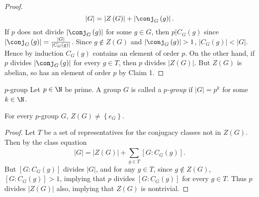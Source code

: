 \documentclass[pmath347]{subfiles}
\begin{document}
\begin{proof}
        \begin{equation*}
            \left| G \right| = \left| Z\left( G \right)  \right| + \left| \conj_G\left( g \right)  \right| .
        \end{equation*}
        If $p$ does not divide $\left| \conj_G\left( g \right) \right|$ for some $g\in G$, then $p|C_G\left( g \right)$ since $\left| \conj_G\left( g \right)  \right| = \frac{\left| G \right| }{\left| C_G\left( g \right)  \right| }$. Since $g\notin Z\left( G \right)$ and $\left| \conj_G\left( g \right)  \right| > 1$, $\left| C_G\left( g \right)  \right| < \left| G \right|$. Hence by induction $C_G\left( g \right)$ contains an element of order $p$. On the other hand, if $p$ divides $\left| \conj_G\left( g \right)  \right|$ for every $g\in T$, then $p$ divides $\left| Z\left( G \right)  \right|$. But $Z\left( G \right)$ is abelian, so has an element of order $p$ by Claim 1.
    \end{proof}

    \begin{definition}{$p$-group}{}
        Let $p\in\N$ be prime. A group $G$ is called a \emph{$p$-group} if $\left| G \right| = p^k$ for some $k\in\N$.
    \end{definition}

    \begin{theorem}{}
        For every $p$-group $G$, $Z\left( G \right) \neq \left\lbrace e_G \right\rbrace$.
    \end{theorem}

    \begin{proof}
        Let $T$ be a set of representatives for the conjugacy classes not in $Z\left( G \right)$. Then by the class equation
        \begin{equation*}
            \left| G \right| = \left| Z\left( G \right)  \right| + \sum^{}_{g\in T} \left[ G:C_G\left( g \right)  \right] .
        \end{equation*}
        But $\left[ G:C_G\left( g \right)  \right] $ divides $\left| G \right|$, and for any $g\in T$, since $g\notin Z\left( G \right)$, $\left[ G:C_G\left( g \right)  \right] > 1$, implying that $p$ divides $\left[ G:C_G\left( g \right)  \right]$ for every $g\in T$. Thus $p$ divides $\left| Z\left( G \right)  \right|$ also, implying that $Z\left( G \right)$ is nontrivial.
    \end{proof}
\end{document}

